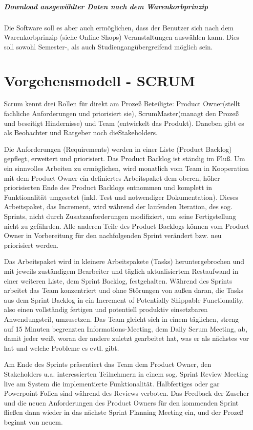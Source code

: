\documentclass[11pt]{scrreprt}
\begin{document}
\paragraph{Download ausgewählter Daten nach dem Warenkorbprinzip}
Die Software soll es aber auch ermöglichen, dass der Benutzer sich nach dem Warenkorbprinzip (siehe Online Shops) Veranstaltungen auswählen kann. Dies soll sowohl Semester-, als auch Studiengangübergreifend möglich sein.

\chapter{Vorgehensmodell - SCRUM}
Scrum kennt drei Rollen für direkt am Prozeß Beteiligte: Product Owner(stellt fachliche Anforderungen und priorisiert sie), ScrumMaster(managt den Prozeß und beseitigt Hindernisse) und Team (entwickelt das Produkt). Daneben gibt es als Beobachter und Ratgeber noch dieStakeholders.

Die Anforderungen (Requirements) werden in einer Liste (Product Backlog) gepflegt, erweitert und priorisiert. Das Product Backlog ist ständig im Fluß. Um ein sinnvolles Arbeiten zu ermöglichen, wird monatlich vom Team in Kooperation mit dem Product Owner ein definiertes Arbeitspaket dem oberen, höher priorisierten Ende des Product Backlogs entnommen und komplett in Funktionalität umgesetzt (inkl. Test und notwendiger Dokumentation). Dieses Arbeitspaket, das Increment, wird während der laufenden Iteration, des sog. Sprints, nicht durch Zusatzanforderungen modifiziert, um seine Fertigstellung nicht zu gefährden. Alle anderen Teile des Product Backlogs können vom Product Owner in Vorbereitung für den nachfolgenden Sprint verändert bzw. neu priorisiert werden.

Das Arbeitspaket wird in kleinere Arbeitspakete (Tasks) heruntergebrochen und mit jeweils zuständigem Bearbeiter und täglich aktualisiertem Restaufwand in einer weiteren Liste, dem Sprint Backlog, festgehalten.  Während des Sprints arbeitet das Team konzentriert und ohne Störungen von außen daran, die Tasks aus dem Sprint Backlog in ein Increment of Potentially Shippable Functionality, also einen vollständig fertigen und potentiell produktiv einsetzbaren Anwendungsteil, umzusetzen. Das Team gleicht sich in einem täglichen, streng auf 15 Minuten begrenzten Informations-Meeting, dem Daily Scrum Meeting, ab, damit jeder weiß, woran der andere zuletzt gearbeitet hat, was er als nächstes vor hat und welche Probleme es evtl. gibt.

Am Ende des Sprints präsentiert das Team dem Product Owner, den Stakeholders u.a. interessierten Teilnehmern in einem sog. Sprint Review Meeting live am System die implementierte Funktionalität. Halbfertiges oder gar Powerpoint-Folien sind während des Reviews verboten. Das Feedback der Zuseher und die neuen Anforderungen des Product Owners für den kommenden Sprint fließen dann wieder in das nächste Sprint Planning Meeting ein, und der Prozeß beginnt von neuem.
\end{document}
